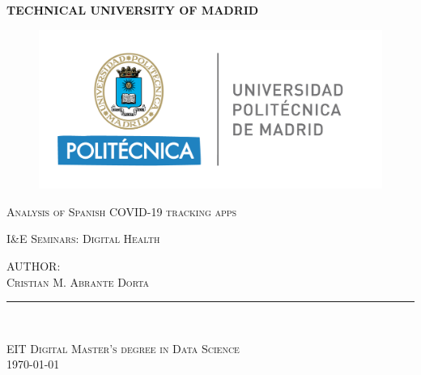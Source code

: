 \begin{titlepage}
\begin{center}
	\vspace{5 mm}
	    \textbf{\Large TECHNICAL UNIVERSITY OF MADRID}
	\par
	\vspace{10 mm}
	\begin{figure}[htb]
	    \centering
	    \includegraphics[scale=0.7]{images/general/uni-logo.png}
	\end{figure}



    \vspace{20 mm}\textsc{\Large Analysis of Spanish COVID-19 tracking apps}
    \par
    \vspace{10 mm}\textsc{I\&E Seminars: Digital Health}
    \par
    \vspace{10 mm}
    \textsc{
        AUTHOR: \\
        Cristian M. Abrante Dorta
    }
    \par
	\rule{80mm}{0.1mm}\\
	\vspace{10 mm}
	
    \textsc{EIT Digital Master's degree in Data Science}\\
    \textsc{\today}
\end{center}
\end{titlepage}

